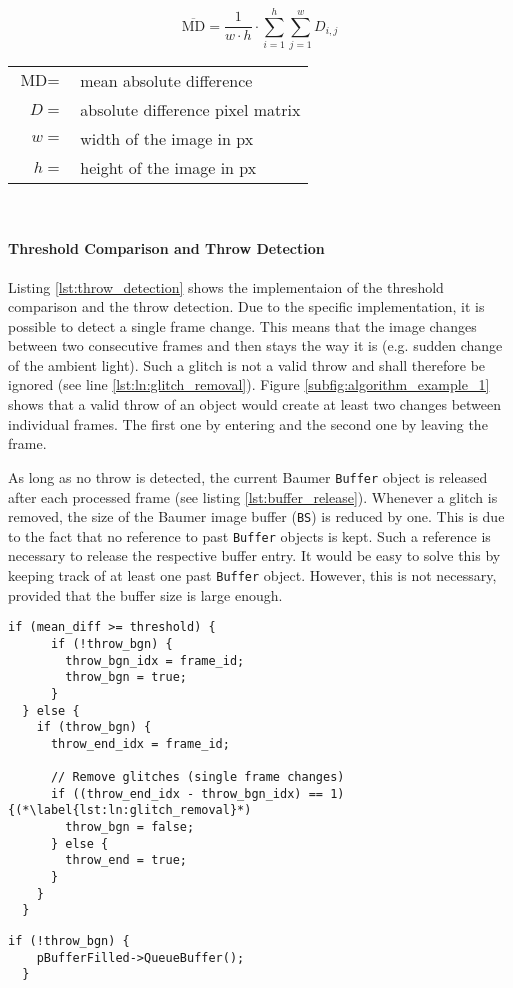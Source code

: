 \begin{equation}
  \overline{\text{MD}} = \frac{1}{w\cdot h} \cdot \sum\limits_{i=1}^h \sum\limits_{j=1}^w D_{i,j}
  \label{eq:mean_diff}
\end{equation}

\begin{tabular}{rl}
  $\text{MD} =$ & mean absolute difference \\
  $D =$ & absolute difference pixel matrix \\
  $w =$ & width of the image in px \\
  $h =$ & height of the image in px \\
\end{tabular}
\\

\paragraph{Threshold Comparison and Throw Detection}
Listing \ref{lst:throw_detection} shows the implementaion of the threshold comparison and the throw detection.
Due to the specific implementation, it is possible to detect a single frame change.
This means that the image changes between two consecutive frames and then stays the way it is (e.g. sudden change of the ambient light).
Such a glitch is not a valid throw and shall therefore be ignored (see line \ref{lst:ln:glitch_removal}).
Figure \ref{subfig:algorithm_example_1} shows that a valid throw of an object would create at least two changes between individual frames.
The first one by entering and the second one by leaving the frame.

As long as no throw is detected, the current Baumer \texttt{Buffer} object is released after each processed frame (see listing \ref{lst:buffer_release}).
Whenever a glitch is removed, the size of the Baumer image buffer (\texttt{BS}) is reduced by one.
This is due to the fact that no reference to past \texttt{Buffer} objects is kept.
Such a reference is necessary to release the respective buffer entry.
It would be easy to solve this by keeping track of at least one past \texttt{Buffer} object.
However, this is not necessary, provided that the buffer size is large enough.

\clearpage

\begin{lstlisting}[style=C++, caption={Throw detection and glitch removal}, label=lst:throw_detection]
  if (mean_diff >= threshold) {
      if (!throw_bgn) {
        throw_bgn_idx = frame_id;
        throw_bgn = true;
      }
  } else {
    if (throw_bgn) {
      throw_end_idx = frame_id;

      // Remove glitches (single frame changes)
      if ((throw_end_idx - throw_bgn_idx) == 1) {(*\label{lst:ln:glitch_removal}*)
        throw_bgn = false;
      } else {
        throw_end = true;
      }
    }
  }
\end{lstlisting}

\begin{lstlisting}[style=C++, caption={Release of the filled Baumer \texttt{Buffer} object}, label=lst:buffer_release]
  if (!throw_bgn) {
    pBufferFilled->QueueBuffer();
  }
\end{lstlisting}
